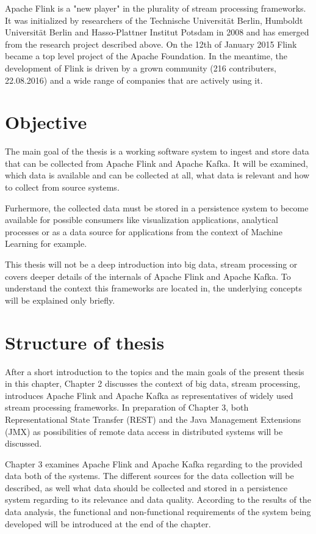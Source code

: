 Apache Flink is a "new player" in the plurality of stream processing frameworks. It was
initialized by researchers of the Technische Universität Berlin, Humboldt Universität
Berlin and Hasso-Plattner Institut Potsdam in 2008 and has emerged from the research project described
above.  On the 12th of January 2015 Flink became a top level project of the Apache Foundation. In the
meantime, the development of Flink is driven by a grown community (216 contributers, 22.08.2016) and
a wide range of companies that are actively using it.

\section{Objective}

The main goal of the thesis is a working software system to ingest and store data that can be collected
from Apache Flink and Apache Kafka. It will be examined, which data is available and can be collected
at all, what data is relevant and how to collect from source systems.

Furhermore, the collected data must be stored in a persistence system to become available
for possible consumers like visualization applications, analytical processes or as a data
source for applications from the context of Machine Learning for example.

This thesis will not be a deep introduction into big data, stream processing or covers deeper
details of the internals of Apache Flink and Apache Kafka. To understand the context this
frameworks are located in, the underlying concepts will be explained only briefly.

\section{Structure of thesis}

After a short introduction to the topics and the main goals of the present thesis in this
chapter, Chapter 2 discusses the context of big data, stream processing, introduces Apache Flink and
Apache Kafka as representatives of widely used stream processing frameworks. In preparation of
Chapter 3, both Representational State Transfer (REST) and the Java Management Extensions (JMX)
as possibilities of remote data access in distributed systems will be discussed.

Chapter 3 examines Apache Flink and Apache Kafka regarding to the provided data both of the systems.
The different sources for the data collection will be described, as well what data should be collected
and stored in a persistence system regarding to its relevance and data quality. According to the results
of the data analysis, the functional and non-functional requirements of the system being developed will
be introduced at the end of the chapter.

